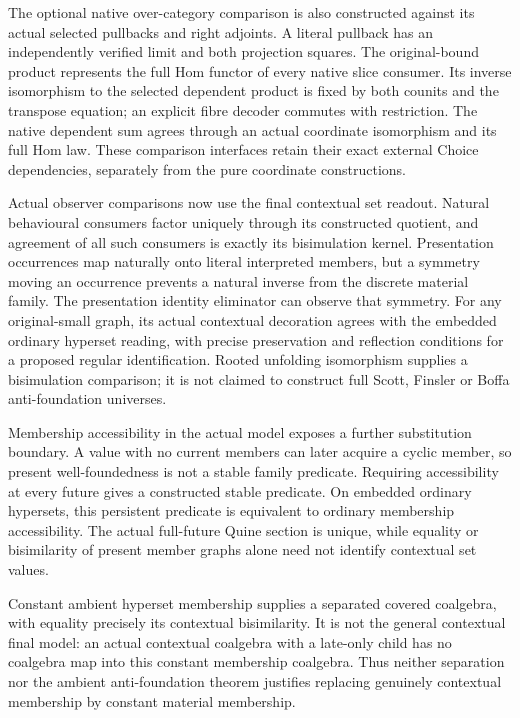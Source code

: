 \documentclass[11pt]{article}
\theoremstyle{definition}
\theoremstyle{remark}
\begin{document}
The optional native over-category comparison is also constructed against
its actual selected pullbacks and right adjoints. A literal pullback has
an independently verified limit and both projection squares. The
original-bound product represents the full Hom functor of every native
slice consumer. Its inverse isomorphism to the selected dependent product
is fixed by both counits and the transpose equation; an explicit fibre
decoder commutes with restriction. The native dependent sum agrees through
an actual coordinate isomorphism and its full Hom law. These comparison
interfaces retain their exact external Choice dependencies, separately
from the pure coordinate constructions.

Actual observer comparisons now use the final contextual set readout.
Natural behavioural consumers factor uniquely through its constructed
quotient, and agreement of all such consumers is exactly its bisimulation
kernel. Presentation occurrences map naturally onto literal interpreted
members, but a symmetry moving an occurrence prevents a natural inverse
from the discrete material family. The presentation identity eliminator
can observe that symmetry. For any original-small graph, its actual
contextual decoration agrees with the embedded ordinary hyperset
reading, with precise preservation and reflection conditions for a
proposed regular identification. Rooted unfolding isomorphism supplies a
bisimulation comparison; it is not claimed to construct full Scott,
Finsler or Boffa anti-foundation universes.

Membership accessibility in the actual model exposes a further
substitution boundary. A value with no current members can later acquire
a cyclic member, so present well-foundedness is not a stable family
predicate. Requiring accessibility at every future gives a constructed
stable predicate. On embedded ordinary hypersets, this persistent
predicate is equivalent to ordinary membership accessibility. The actual
full-future Quine section is unique, while equality or bisimilarity of
present member graphs alone need not identify contextual set values.

Constant ambient hyperset membership supplies a separated covered
coalgebra, with equality precisely its contextual bisimilarity.  It is
not the general contextual final model: an actual contextual coalgebra
with a late-only child has no coalgebra map into this constant
membership coalgebra.  Thus neither separation nor the ambient
anti-foundation theorem justifies replacing genuinely contextual
membership by constant material membership.
\end{document}
